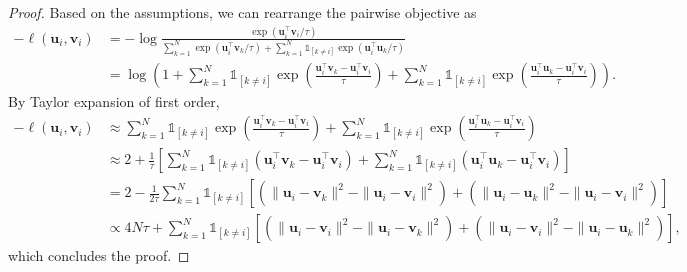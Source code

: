\documentclass{article}
\theoremstyle{remark}
\begin{document}
\begin{proof}
Based on the assumptions, we can rearrange the pairwise objective as
\begin{equation}
	\begin{aligned}
		- \ell(\bm{u}_i, \bm{v}_i) & = - \log \frac {\exp \left( \bm{u}_i^\top \bm{v}_{i} / \tau\right)} {\sum_{k=1}^{N}  \exp \left( \bm{u}_i^\top \bm{v}_k / \tau\right) + \sum_{k=1}^{N} \mathds 1_{[k \neq i]} \exp \left( \bm{u}_i^\top \bm{u}_k / \tau\right)} \\
		& = \log \left( 1 + \sum_{k=1}^{N} \mathds 1_{[k \neq i]} \exp\left( \frac { {\bm u}_i^\top {\bm v}_k - {\bm u}_i^\top {\bm v}_i} {\tau} \right) + \sum_{k=1}^{N} \mathds 1_{[k \neq i]} \exp\left( \frac { {\bm u}_i^\top {\bm u}_k - {\bm u}_i^\top {\bm v}_i} {\tau} \right) \right).
	\end{aligned}
\end{equation}
By Taylor expansion of first order,
\begin{equation}
	\begin{aligned}
		- \ell( {\bm u}_i, {\bm v}_i) &\approx \sum_{k=1}^{N} \mathds 1_{[k \neq i]} \exp\left( \frac { {\bm u}_i^\top {\bm v}_k - {\bm u}_i^\top {\bm v}_i} {\tau} \right) + \sum_{k=1}^{N} \mathds 1_{[k \neq i]} \exp\left( \frac { {\bm u}_i^\top {\bm u}_k - {\bm u}_i^\top {\bm v}_i} {\tau} \right) \\
	& \approx 2 + \frac 1 \tau \left[ \sum_{k=1}^{N} \mathds 1_{[k \neq i]} (  {\bm u}_i^\top {\bm v}_k - {\bm u}_i^\top {\bm v}_i) + \sum_{k=1}^{N} \mathds 1_{[k \neq i]} ( {\bm u}_i^\top {\bm u}_k - {\bm u}_i^\top {\bm v}_i) \right] \\
	& = 2 - \frac 1 {2 \tau}\sum_{k=1}^{N} \mathds 1_{[k \neq i]}  \left[ \left(\| {\bm u_i} - {\bm v_k} \|^2 - \| {\bm u_i} - {\bm v_i} \|^2 \right) + \left(\| {\bm u_i} - {\bm u_k} \|^2 - \| {\bm u_i} - {\bm v_i} \|^2 \right) \right] \\
	& \propto 4N\tau + \sum_{k=1}^{N} \mathds 1_{[k \neq i]} \left[ \left(\| {\bm u_i} - {\bm v_i} \|^2 - \| {\bm u_i} - {\bm v_k} \|^2\right) + \left(\| {\bm u_i} - {\bm v_i} \|^2 - \| {\bm u_i} - {\bm u_k} \|^2\right) \right],
	\end{aligned}
\end{equation}
which concludes the proof.
\end{proof}
 
\small


\end{document}
